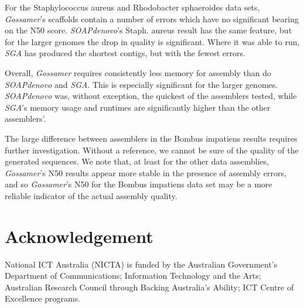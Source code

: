 \documentclass{bioinfo}
\newcommand{\Gossamer}{\textit{Gossamer}}
\newcommand{\SOAPdenovo}{\textit{SOAPdenovo}}
\newcommand{\SGA}{\textit{SGA}}
\begin{document}
For the Staphylococcus aureus and Rhodobacter sphaeroides data sets, \Gossamer{}'s scaffolds contain a number of errors which have no significant bearing on the N50 score. \SOAPdenovo{}'s Staph. aureus result has the same feature, but for the larger genomes the drop in quality is significant.
Where it was able to run, \SGA{} has produced the shortest contigs, but with the fewest errors. 

Overall, \Gossamer{} requires consistently less memory for assembly than do \SOAPdenovo{} and \SGA{}. This is especially significant for the larger genomes. \SOAPdenovo{} was, without exception, the quickest of the assemblers tested, while \SGA{}'s memory usage and runtimes are significantly higher than the other assemblers'.

The large difference between assemblers in the Bombus impatiens results requires further investigation.
Without a reference, we cannot be sure of the quality of the generated sequences. We note that, at least for the other data assemblies, \Gossamer{}'s N50 results appear more stable in the presence of assembly errors, and so \Gossamer{}'s N50 for the Bombus impatiens data set may be a more reliable indicator of the actual assembly quality.

\vspace{-1.5em}
\section*{Acknowledgement}

National ICT Australia (NICTA) is funded by the Australian Government's Department of Communications; 
Information Technology and the Arts;  
Australian Research Council through Backing Australia's Ability; 
ICT Centre of Excellence programs.




\vspace{-1.5em}

\end{document}
